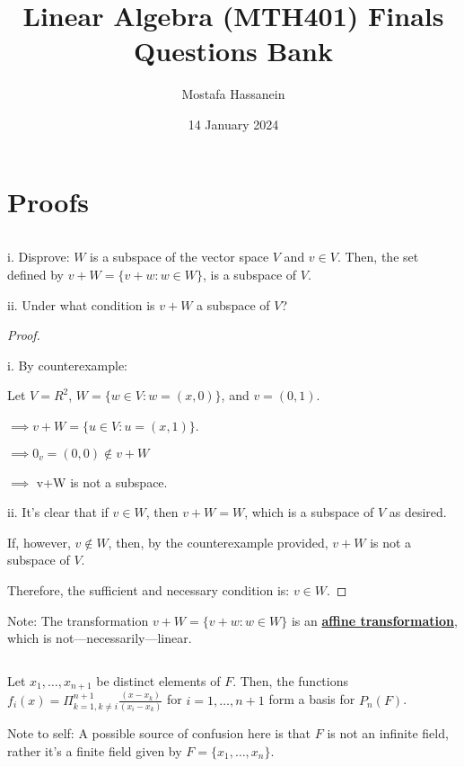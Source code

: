 \documentclass{article}
\author{Mostafa Hassanein}
\title{Linear Algebra (MTH401) Finals Questions Bank}
\date{14 January 2024}
\newenvironment{customthm}[1]
  {\renewcommand\theinnercustomthm{#1}\innercustomthm}
  {\endinnercustomthm}
\begin{document}
\maketitle

\newpage

\section*{Proofs}

\begin{customthm}{1}[2023.S(1.A.i)]
  $ $

  i. Disprove: $W$ is a subspace of the vector space $V$ and $v \in V$. Then, the set defined by $v+W = \{ v+w: w \in W \}$, is a subspace of $V$.
  \newline

  ii. Under what condition is $v+W$ a subspace of $V$?
\end{customthm}

\begin{proof}
  $ $

  i. By counterexample: 
  
  Let $V = R^2$, $W = \{ w \in V: w = (x,0) \}$, and $v = (0, 1)$.
  
  \noindent
  $\implies v+W = \{ u \in V: u = (x, 1) \}$.

  \noindent
  $\implies 0_v = (0, 0) \notin v+W$

  \noindent
  $\implies$ v+W is not a subspace.
  \newline

  ii. It's clear that if $v \in W$, then $v+W = W$, which is a subspace of $V$ as desired.

  If, however, $v \notin W$, then, by the counterexample provided, $v+W$ is not a subspace of $V$.

  Therefore, the sufficient and necessary condition is: $v \in W$.

\end{proof}

\noindent
Note: The transformation $v+W = \{ v+w: w \in W \}$ is an \underline{\textbf{affine transformation}}, which is not—necessarily—linear.

\newpage

\begin{customthm}{2}[2023.S(1.A.ii)]
  $ $

  Let $x_1,\ldots,x_{n+1}$ be distinct elements of $F$. Then, the functions $f_i(x)= \Pi_{k=1,k \neq i}^{n+1} \frac{(x-x_k)}{(x_i-x_k)}$ for $i=1,\ldots,n+1$ form a basis for $P_n(F)$.
  \newline

  Note to self: A possible source of confusion here is that $F$ is not an infinite field, rather it's a finite field given by $F = \{x_1,\ldots,x_n \}$.
\end{customthm}
\end{document}
